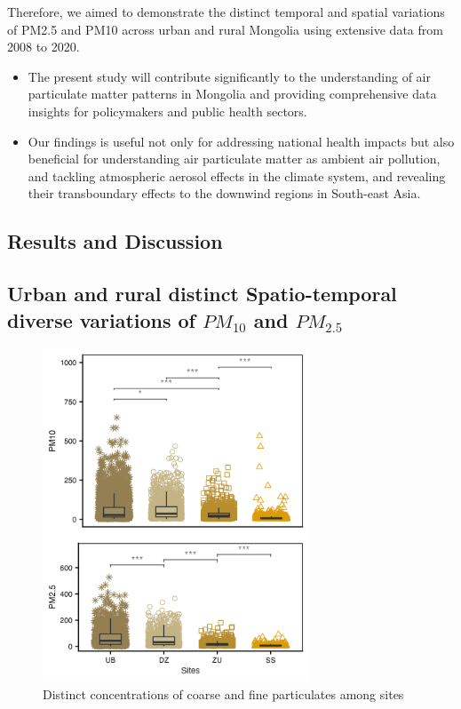 \documentclass[
  11pt,
]{article}
\providecommand{\tightlist}{%
  \setlength{\itemsep}{0pt}\setlength{\parskip}{0pt}}
\begin{document}
Therefore, we aimed to demonstrate the distinct temporal and spatial
variations of PM2.5 and PM10 across urban and rural Mongolia using
extensive data from 2008 to 2020.

\begin{itemize}
\tightlist
\item
  The present study will contribute significantly to the understanding
  of air particulate matter patterns in Mongolia and providing
  comprehensive data insights for policymakers and public health
  sectors.
\item
  Our findings is useful not only for addressing national health impacts
  but also beneficial for understanding air particulate matter as
  ambient air pollution, and tackling atmospheric aerosol effects in the
  climate system, and revealing their transboundary effects to the
  downwind regions in South-east Asia.
\end{itemize}

\newpage

\subsection{Results and Discussion}\label{results-and-discussion}

\newpage
\subsection{Urban and rural distinct Spatio-temporal diverse variations of $PM_{10}$ and $PM_{2.5}$}

\begin{figure}
\centering
\includegraphics[width=3.125in,height=\textheight,keepaspectratio]{images/figure_3.png}
\caption{Distinct concentrations of coarse and fine particulates among
sites}
\end{figure}
\end{document}

